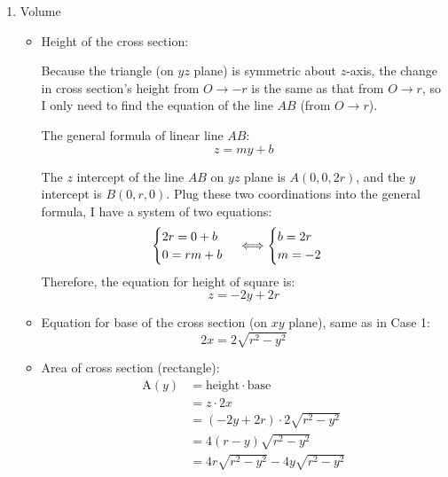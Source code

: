 \documentclass[12pt]{article}
\begin{document}
\begin{enumerate}
    
    
    \item Volume \par
    \begin{itemize}
    \item Height of the cross section:\par
    
    Because the triangle (on $yz$ plane) is symmetric about $z$-axis, the change in cross section's height from $O\to -r$ is the same as that from $O\to r$, so I only need to find the equation of the line $AB$ (from $O\to r$).
    
    The general formula of linear line $AB$: $$z = my + b$$ \par
    The $z$ intercept of the line $AB$ on $yz$ plane is $A(0,0,2r)$, and the $y$ intercept is $B(0,r,0)$. Plug these two coordinations into the general formula, I have a system of two equations:
    \begin{equation*}
    \begin{cases}
        2r=0 + b\\
        0=rm+b
    \end{cases} \\
    \Longleftrightarrow
    \begin{cases}
        b=2r\\
        m=-2
    \end{cases}
    \end{equation*}
    Therefore, the equation for height of square is:
    $$z=-2y+2r$$
    
    \par
    \item Equation for base of the cross section (on $xy$ plane), same as in Case 1:
    $$2x=2\sqrt{r^2-y^2}$$ \par
    \item Area of cross section (rectangle): 
    \begin{align*}
        \mathrm{A}(y)&=\text{height} \cdot \text{base}\\
        &=z\cdot 2x \\
        &=\left(-2y+2r\right)\cdot 2\sqrt{r^2-y^2}\\
        &= 4\left(r-y\right)\sqrt{r^2-y^2}\\
        &= 4r\sqrt{r^2-y^2}-4y\sqrt{r^2-y^2}
    \end{align*}
    

\end{itemize}
\end{enumerate}
\end{document}
